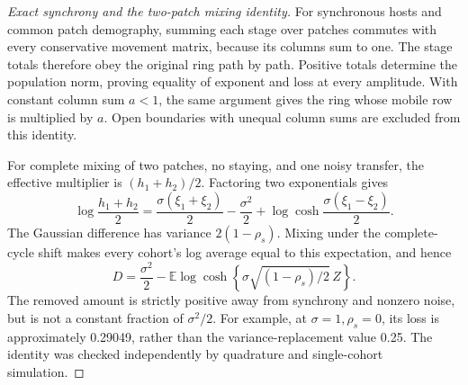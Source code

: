 \begin{proof}[Exact synchrony and the two-patch mixing identity]
For synchronous hosts and common patch demography, summing each stage over patches commutes with every conservative movement matrix, because its columns sum to one. The stage totals therefore obey the original ring path by path. Positive totals determine the population norm, proving equality of exponent and loss at every amplitude. With constant column sum \(a<1\), the same argument gives the ring whose mobile row is multiplied by \(a\). Open boundaries with unequal column sums are excluded from this identity.

For complete mixing of two patches, no staying, and one noisy transfer, the effective multiplier is \((h_1+h_2)/2\). Factoring two exponentials gives
\[
 \log\frac{h_1+h_2}{2}=\frac{\sigma(\xi_1+\xi_2)}2-\frac{\sigma^2}2
 +\log\cosh\frac{\sigma(\xi_1-\xi_2)}2.
\]
The Gaussian difference has variance \(2(1-\rho_s)\). Mixing under the complete-cycle shift makes every cohort's log average equal to this expectation, and hence
\begin{equation}\label{eq:mech-spatial-cosh}
 D=\frac{\sigma^2}2-\mathbb E\log\cosh\left\{\sigma\sqrt{(1-\rho_s)/2}\,Z\right\}.
\end{equation}
The removed amount is strictly positive away from synchrony and nonzero noise, but is not a constant fraction of \(\sigma^2/2\). For example, at \(\sigma=1,\rho_s=0\), its loss is approximately 0.29049, rather than the variance-replacement value 0.25. The identity was checked independently by quadrature and single-cohort simulation.
\end{proof}

